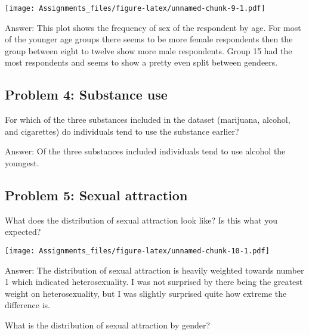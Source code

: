 \documentclass[
]{article}
\newenvironment{Shaded}{\begin{snugshade}}{\end{snugshade}}
\newcommand{\DataTypeTok}[1]{\textcolor[rgb]{0.13,0.29,0.53}{#1}}
\newcommand{\KeywordTok}[1]{\textcolor[rgb]{0.13,0.29,0.53}{\textbf{#1}}}
\newcommand{\NormalTok}[1]{#1}
\newcommand{\OperatorTok}[1]{\textcolor[rgb]{0.81,0.36,0.00}{\textbf{#1}}}
\newcommand{\StringTok}[1]{\textcolor[rgb]{0.31,0.60,0.02}{#1}}
\begin{document}
\texttt{[image: Assignments\_files/figure-latex/unnamed-chunk-9-1.pdf]}

Answer: This plot shows the frequency of sex of the respondent by age.
For most of the younger age groups there seems to be more female
respondents then the group between eight to twelve show more male
respondents. Group 15 had the most respondents and seems to show a
pretty even split between gendeers.

\hypertarget{problem-4-substance-use}{%
\subsection{Problem 4: Substance use}\label{problem-4-substance-use}}

For which of the three substances included in the dataset (marijuana,
alcohol, and cigarettes) do individuals tend to use the substance
earlier?

Answer: Of the three substances included individuals tend to use alcohol
the youngest.

\hypertarget{problem-5-sexual-attraction}{%
\subsection{Problem 5: Sexual
attraction}\label{problem-5-sexual-attraction}}

What does the distribution of sexual attraction look like? Is this what
you expected?

\begin{Shaded}
\end{Shaded}

\texttt{[image: Assignments\_files/figure-latex/unnamed-chunk-10-1.pdf]}

Answer: The distribution of sexual attraction is heavily weighted
towards number 1 which indicated heterosexuality. I was not surprised by
there being the greatest weight on heterosexuality, but I was slightly
surprised quite how extreme the difference is.

What is the distribution of sexual attraction by gender?

\begin{Shaded}
\end{Shaded}
\end{document}
